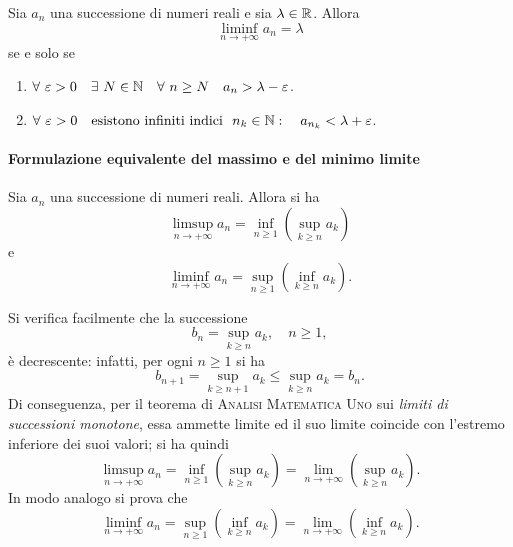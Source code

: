 \begin{propositionqed}
	Sia $a_n$ una successione di numeri reali e sia $\lambda \in \mathbb{R}$. Allora 
	\begin{equation*}
		\liminf_{n\to +\infty} a_n =\lambda
	\end{equation*}
	se e solo se
	\begin{enumerate}
		\item $\forall \ \varepsilon>0 \quad \exists \ N\in \mathbb{N}\quad \forall \ n\geq N \quad a_n>\lambda -\varepsilon$.
		\item $\forall \ \varepsilon>0 \quad \mbox{esistono infiniti indici }\ n_k\in \mathbb{N}:\quad a_{n_k}<\lambda +\varepsilon$.\qedhere
	\end{enumerate}
\end{propositionqed}
\paragraph{Formulazione equivalente del massimo e del minimo limite}
\begin{proposition}
	Sia $a_n$ una successione di numeri reali. Allora si ha
	\begin{equation}
		\limsup_{n\to +\infty} a_n = \inf_{n\geq 1} \left( \sup_{k\geq n} a_k\right)
	\end{equation}
	e
	\begin{equation}
		\liminf_{n\to +\infty} a_n = \sup_{n\geq 1} \left( \inf_{k\geq n} a_k\right).
	\end{equation}
\end{proposition}
\begin{observe}
	Si verifica facilmente che la successione
	\begin{equation*}
	b_n=  \sup_{k\geq n} a_k,\quad n\geq 1,
	\end{equation*}
	è decrescente: infatti, per ogni $n\geq 1$ si ha
	\begin{equation*}
		b_{n+1} = \sup_{k\geq n+1} a_k \leq \sup_{k\geq n} a_k =b_n.
	\end{equation*}
	Di conseguenza, per il teorema di \textsc{Analisi Matematica Uno} sui \textit{limiti di successioni monotone}, essa ammette limite ed il suo limite coincide con l'estremo inferiore dei suoi valori; si ha quindi
	\begin{equation}
		\limsup_{n\to +\infty} a_n = \inf_{n\geq 1} \left( \sup_{k\geq n} a_k\right) = \lim_{n\to +\infty} \left( \sup_{k\geq n} a_k\right).
	\end{equation}
	In modo analogo si prova che 
	\begin{equation}
		\liminf_{n\to +\infty} a_n = \sup_{n\geq 1} \left( \inf_{k\geq n} a_k\right) = \lim_{n\to +\infty} \left( \inf_{k\geq n} a_k\right).
	\end{equation}
\end{observe}

